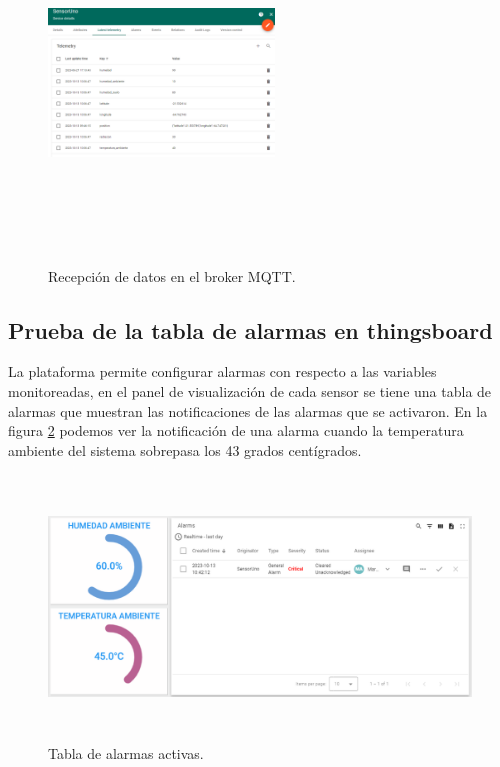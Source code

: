 \begin{figure}[h!]
  \centering
    \includegraphics[width=6cm, height=9.5cm]{./Figures/tb_recepcion.png}
  \caption{Recepción de datos en el broker MQTT.}
    \label{fig:tb recepcion}
\end{figure}

\subsection{Prueba de la tabla de alarmas en thingsboard}
La plataforma permite configurar alarmas con respecto a las variables monitoreadas, en el panel de visualización de cada sensor se tiene una tabla de alarmas que muestran las notificaciones de las alarmas que se activaron.
En la figura \ref{fig:alarmas tb} podemos ver la notificación de una alarma cuando la temperatura ambiente del sistema sobrepasa los 43 grados centígrados.

\begin{figure}[h!]
  \centering
    \includegraphics[width=\linewidth, height=7cm]{./Figures/alarmas_tb.png}
  \caption{Tabla de alarmas activas.}
    \label{fig:alarmas tb}
\end{figure}


